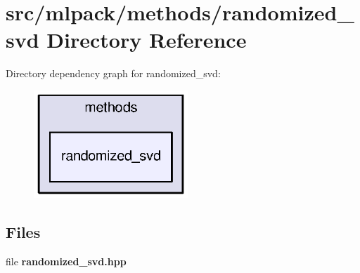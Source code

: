 \section{src/mlpack/methods/randomized\+\_\+svd Directory Reference}
\label{dir_2fc1595eb878e336b6604e9b96f83670}
Directory dependency graph for randomized\+\_\+svd\+:
\nopagebreak
\begin{figure}[H]
\begin{center}
\leavevmode
\includegraphics[width=164pt]{dir_2fc1595eb878e336b6604e9b96f83670_dep}
\end{center}
\end{figure}
\subsection*{Files}
\begin{DoxyCompactItemize}
\item 
file {\bf randomized\+\_\+svd.\+hpp}
\end{DoxyCompactItemize}

